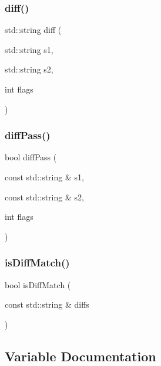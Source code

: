\subsubsection{\texorpdfstring{diff()}{diff()}}
{\footnotesize\ttfamily std\+::string diff (\begin{DoxyParamCaption}\item[{std\+::string}]{s1,  }\item[{std\+::string}]{s2,  }\item[{int}]{flags }\end{DoxyParamCaption})}

\mbox{\label{namespacediff_a68a39e10b40db02df1d941fe83cc9828}} 
\subsubsection{\texorpdfstring{diff\+Pass()}{diffPass()}}
{\footnotesize\ttfamily bool diff\+Pass (\begin{DoxyParamCaption}\item[{const std\+::string \&}]{s1,  }\item[{const std\+::string \&}]{s2,  }\item[{int}]{flags }\end{DoxyParamCaption})}

\mbox{\label{namespacediff_a02aeebb7bbdd2871ba3d5470721004e5}} 
\subsubsection{\texorpdfstring{is\+Diff\+Match()}{isDiffMatch()}}
{\footnotesize\ttfamily bool is\+Diff\+Match (\begin{DoxyParamCaption}\item[{const std\+::string \&}]{diffs }\end{DoxyParamCaption})}



\subsection{Variable Documentation}
\mbox{\label{namespacediff_a5044abd56bc89e814e2d953b8e8c0a65}} 
